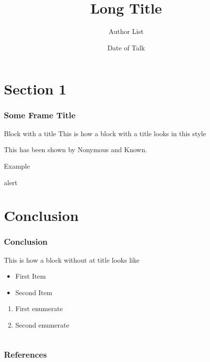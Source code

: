 \documentclass[compress]{beamer}
\title[Short Title] {Long Title}
\author[short author list] {Author List}
\institute{University of Liverpool}
\date{Date of Talk}
\newcommand{\backupbegin}{
   \newcounter{finalframe}
   \setcounter{finalframe}{\value{framenumber}}
}
\newcommand{\backupend}{
   \setcounter{framenumber}{\value{finalframe}}
}
\begin{document}
\begin{frame}
  \titlepage 
\end{frame}


\section{Section 1}
\begin{frame}[label=sect1] 
  \frametitle{Some Frame Title}
  \begin{block}{Block with a title}
    This is how a block with a title looks in this style
  \end{block}
  This has been shown by Nonymous and Known\cite{ref1}.
  \begin{exampleblock}{Example}
  \end{exampleblock}
  \begin{alertblock}{alert}
    \end{alertblock}
\end{frame}


\section{Conclusion}
\label{sec:conc}
\begin{frame}[label=conclusion]
\frametitle{Conclusion}
\begin{block}{}
  This is how a block without at title looks like
\end{block}
\begin{itemize}
\item First Item
\item Second Item
\end{itemize}
\begin{enumerate}
\item First enumerate
\item Second enumerate
\end{enumerate}
\end{frame}

\section*{}


%
%

\appendix
\backupbegin

\begin{frame}[allowframebreaks]
\frametitle{References}



\end{frame}

\backupend
\end{document}
